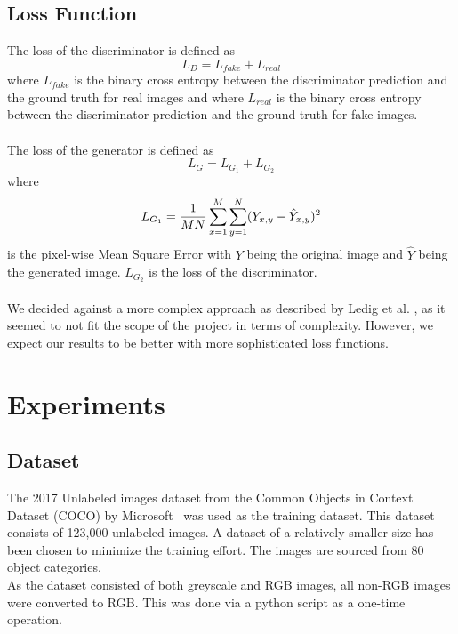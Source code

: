\documentclass[11pt,twocolumn,twoside,paper=a4]{IEEEtran}
\begin{document}
\subsection{Loss Function}
The loss of the discriminator is defined as $$L_D = L_{fake} + L_{real}$$ where $L_{fake}$ is the binary cross entropy between the discriminator prediction and the ground truth for real images and where $L_{real}$ is the binary cross entropy between the discriminator prediction and the ground truth for fake images.\\
\\
The loss of the generator is defined as $$L_G = L_{G_1} + L_{G_2}$$ where $$L_{G_1}  = {1 \over MN} \sum_{x=1}^M \sum_{y=1}^N (Y_{x,y} - \hat{Y}_{x,y})^2$$ is the pixel-wise Mean Square Error with $Y$ being the original image and $\hat{Y}$ being the generated image. $L_{G_2}$ is the loss of the discriminator.\\
\\
We decided against a more complex approach as described by Ledig et al. \cite{DBLP:journals/corr/LedigTHCATTWS16}, as it seemed to not fit the scope of the project in terms of complexity. However, we expect our results to be better with more sophisticated loss functions.


\section{Experiments}

\subsection{Dataset}
The 2017 Unlabeled images dataset from the Common Objects in Context Dataset (COCO) by Microsoft~\cite{lin2015microsoft} was used as the training dataset. This dataset consists of 123,000 unlabeled images. A dataset of a relatively smaller size has been chosen to minimize the training effort. The images are sourced from 80 object categories. \\
As the dataset consisted of both greyscale and RGB images, all non-RGB images were converted to RGB. This was done via a python script as a one-time operation.
\end{document}
